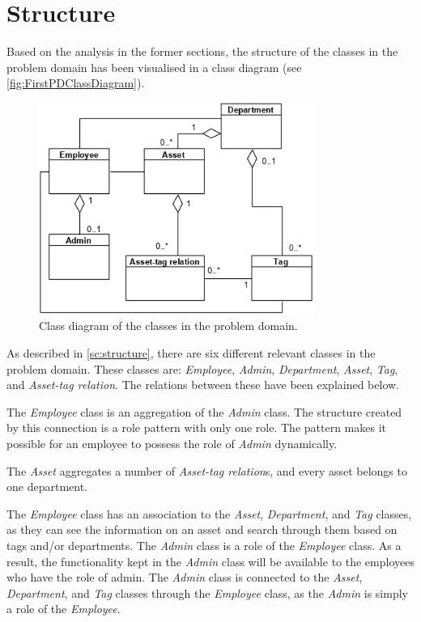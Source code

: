 \section{Structure}\label{sc:structure}
Based on the analysis in the former sections, the structure of the classes in the problem domain has been visualised in a class diagram (see \autoref{fig:FirstPDClassDiagram}).

\begin{figure}[H]
    \centering
    \includegraphics[width=0.8\textwidth]{figures/ClassDiagrams/Class_activity_class_diagram.png}
    \caption{Class diagram of the classes in the problem domain.}
    \label{fig:FirstPDClassDiagram}
\end{figure}

As described in \autoref{sc:structure}, there are six different relevant classes in the problem domain. These classes are: \textit{Employee}, \textit{Admin}, \textit{Department}, \textit{Asset}, \textit{Tag}, and \textit{Asset-tag relation}. The relations between these have been explained below.
\par

The \textit{Employee} class is an aggregation of the \textit{Admin} class. The structure created by this connection is a role pattern with only one role. The pattern makes it possible for an employee to possess the role of \textit{Admin} dynamically.
\par

The \textit{Asset} aggregates a number of \textit{Asset-tag relation}s, and every asset belongs to one department.
\par

The \textit{Employee} class has an association to the \textit{Asset}, \textit{Department}, and \textit{Tag} classes, as they can see the information on an asset and search through them based on tags and/or departments. The \textit{Admin} class is a role of the \textit{Employee} class. As a result, the functionality kept in the \textit{Admin} class will be available to the employees who have the role of admin. The \textit{Admin} class is connected to the \textit{Asset}, \textit{Department}, and \textit{Tag} classes through the \textit{Employee} class, as the \textit{Admin} is simply a role of the \textit{Employee}.
\par

